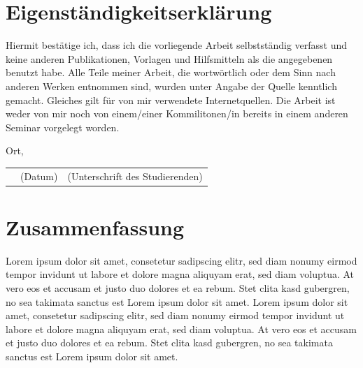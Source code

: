 \documentclass{article}
\begin{document}

\section*{Eigenständigkeitserklärung}
Hiermit bestätige ich, dass ich die vorliegende Arbeit selbstständig verfasst und keine anderen Publikationen, Vorlagen und Hilfsmitteln als die angegebenen benutzt habe. Alle Teile meiner Arbeit, die wortwörtlich oder dem Sinn nach anderen Werken entnommen sind, wurden unter Angabe der Quelle kenntlich gemacht. Gleiches gilt für von mir verwendete Internetquellen. Die Arbeit ist weder von mir noch von einem/einer Kommilitonen/in bereits in einem anderen Seminar vorgelegt worden. 

\vspace{1cm}

Ort, \underline{\hspace{0.815\textwidth}}\\
\begin{tabular}{lll}
\hspace{3cm} & \small(Datum)\hspace{1cm} & \hspace{2cm}\small(Unterschrift des Studierenden) \normalsize 
\end{tabular}

\newpage

\section*{Zusammenfassung}

Lorem ipsum dolor sit amet, consetetur sadipscing elitr, sed diam nonumy eirmod tempor invidunt ut labore et dolore magna aliquyam erat, sed diam voluptua. At vero eos et accusam et justo duo dolores et ea rebum. Stet clita kasd gubergren, no sea takimata sanctus est Lorem ipsum dolor sit amet. Lorem ipsum dolor sit amet, consetetur sadipscing elitr, sed diam nonumy eirmod tempor invidunt ut labore et dolore magna aliquyam erat, sed diam voluptua. At vero eos et accusam et justo duo dolores et ea rebum. Stet clita kasd gubergren, no sea takimata sanctus est Lorem ipsum dolor sit amet.

\newpage

\tableofcontents

\newpage
\listoffigures
{}

\newpage
\listoftables
{}
\end{document}
